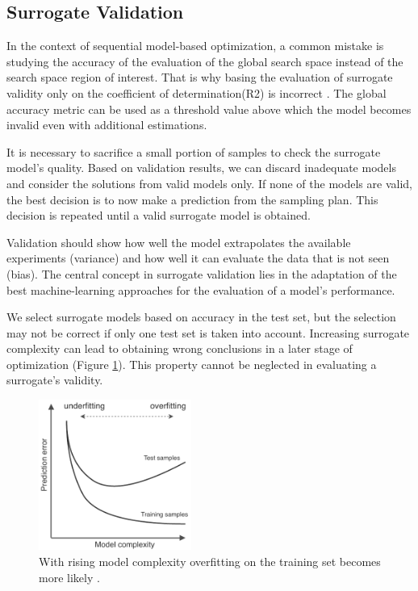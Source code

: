         \subsection{Surrogate Validation}
        In the context of sequential model-based optimization, a common mistake is studying the accuracy of the evaluation of the global search space instead of the search space region of interest. That is why basing the evaluation of surrogate validity only on the coefficient of determination(R2) is incorrect \cite{nardi2019practical}. The global accuracy metric can be used as a threshold value above which the model becomes invalid even with additional estimations.

        It is necessary to sacrifice a small portion of samples to check the surrogate model's quality. Based on validation results, we can discard inadequate models and consider the solutions from valid models only. If none of the models are valid, the best decision is to now make a prediction from the sampling plan. This decision is repeated until a valid surrogate model is obtained.

        Validation should show how well the model extrapolates the available experiments (variance) and how well it can evaluate the data that is not seen (bias). The central concept in surrogate validation lies in the adaptation of the best machine-learning approaches for the evaluation of a model's performance. 

        We select surrogate models based on accuracy in the test set, but the selection may not be correct if only one test set is taken into account. Increasing surrogate complexity can lead to obtaining wrong conclusions in a later stage of optimization (Figure \ref{fig:cv_overfitting}). This property cannot be neglected in evaluating a surrogate's validity. 


        \begin{figure}[h]
            \centering
            \includegraphics[width=5cm]{content/images/utility/cv_2x_test}
            \caption[surrogate validation: overfitting on the training set]{With rising model complexity overfitting on the training set becomes more likely \cite{HastieFT01, TobiasCV}.} 
            \label{fig:cv_overfitting}   
        \end{figure}

